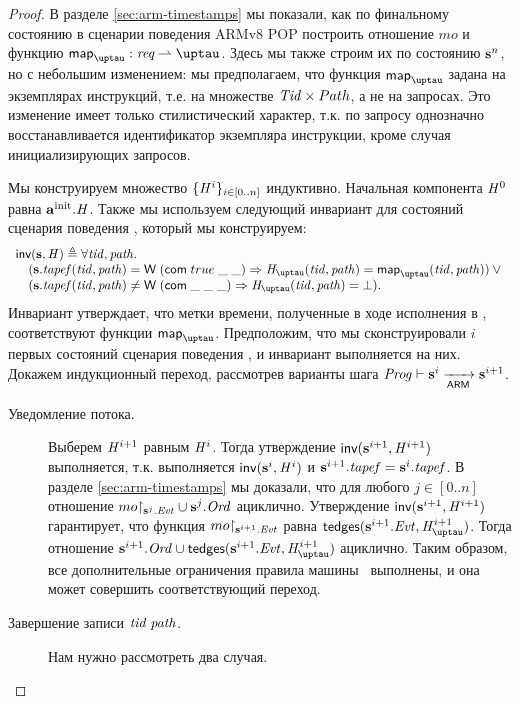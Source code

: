 \begin{proof}
  В разделе \ref{sec:arm-timestamps} мы показали, как по финальному состоянию в
  сценарии поведения ARMv8 POP построить отношение $mo$ и функцию
  $\taumapping : \Request \rightharpoonup \tau$.
  Здесь мы также строим их по состоянию $\mathbf{s}^n$, но с небольшим изменением:
  мы предполагаем, что  функция $\taumapping$ задана на экземплярах инструкций,
  т.е. на множестве $\mathit{Tid} \times Path$, а не на запросах.
  Это изменение имеет только стилистический характер, т.к. по запросу
  однозначно восстанавливается идентификатор экземпляра инструкции,
  кроме случая инициализирующих запросов.

  Мы конструируем множество $\{\mathit{H}^i \}_{i \in [0..n]}$ индуктивно.
  Начальная компонента $\mathit{H}^0$ равна $\mathbf{a}^{\rm init}.\mathit{H}$.
  Также мы используем следующий инвариант для состояний сценария поведения \ARMt,
  который мы конструируем:
  \[\begin{array}{l}
  \invTT(\s, \hmap) \triangleq \forall \tId, \cpath. \\
  \quad (\s.\tapef(\tId, \cpath) = \tapeWrite{(\tapeWriteCommitted{true}{\_}{\_})} \Rightarrow
         \tmap(\tId, \cpath) = \taumapping(\tId, \cpath)) \lor {} \\
  \quad (\s.\tapef(\tId, \cpath) \not = \tapeWrite{(\tapeWriteCommitted{\_}{\_}{\_})} \Rightarrow
         \tmap(\tId, \cpath) = \bot).
  \end{array}\]
  Инвариант утверждает, что метки времени, полученные в ходе исполнения в \ARMt,
  соответствуют функции $\taumapping$. 
  Предположим, что мы сконструировали $i$ первых состояний сценария поведения \ARMt,
  и инвариант выполняется на них.
  Докажем индукционный переход, рассмотрев варианты шага $\mathit{Prog} \vdash \mathbf{s}^i \xrightarrow[\mathsf{ARM}]{} \mathbf{s}^{i + 1}$.
  \begin{description}
  \item[Уведомление потока.]
    Выберем $\mathit{H}^{i + 1}$ равным $\mathit{H}^{i}$. 
    Тогда утверждение $\textsf{inv}(\mathbf{s}^{i + 1}, \mathit{H}^{i + 1})$ выполняется, т.к.
    выполняется $\textsf{inv}(\mathbf{s}^{i}, \mathit{H}^{i})$ и
    $\mathbf{s}^{i + 1}.\mathit{tapef} = \mathbf{s}^{i}.\mathit{tapef}$.
    В разделе \ref{sec:arm-timestamps} мы доказали, что
    для любого $j \in [0..n]$ отношение $mo{\restriction_{\mathbf{s}^j.\mathit{Evt}}} \cup \mathbf{s}^j.\mathit{Ord}$ ациклично.
    Утверждение $\textsf{inv}(\mathbf{s}^{i + 1}, \mathit{H}^{i + 1})$ гарантирует, что
    функция $mo{\restriction_{\mathbf{s}^{i+1}.\mathit{Evt}}}$ равна $\moTau(\s^{i+1}.\Evt, \tmap^{i+1})$.
    Тогда отношение $\s^{i+1}.\Ord \cup \moTau(\s^{i+1}.\Evt, \tmap^{i+1})$ ациклично.
    Таким образом, все дополнительные ограничения правила 
    машины \ARMt~выполнены, и она может совершить соответствующий переход.
  \item[Завершение записи $\mathit{tid} \; \mathit{path}$.]
    Нам нужно рассмотреть два случая.
    

\end{description}
\end{proof}

